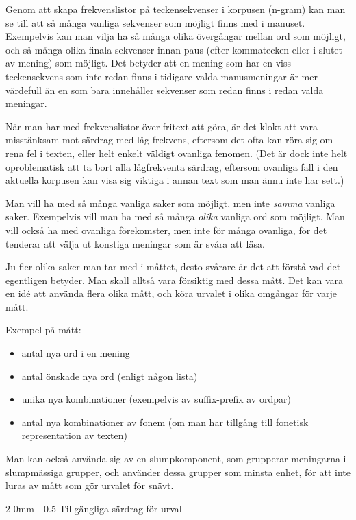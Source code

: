 \documentclass[11pt, a4paper, twoside]{article}
\makeatletter
\renewcommand{\subsection}{\@startsection
  {subsection}%
  {2}%
  {0mm}%
  {-\baselineskip}%
  {0.5\baselineskip}%
  {\bfseries\sffamily\large}}%
\makeatother
\begin{document}
Genom att skapa frekvenslistor på teckensekvenser i korpusen (n-gram) kan man se till att så många vanliga sekvenser som möjligt finns med i manuset. Exempelvis kan man vilja ha så många olika övergångar mellan ord som möjligt, och så många olika finala sekvenser innan paus (efter kommatecken eller i slutet av mening) som möjligt. Det betyder att en mening som har en viss teckensekvens som inte redan finns i tidigare valda manusmeningar är mer värdefull än en som bara innehåller sekvenser som redan finns i redan valda meningar. 

När man har med frekvenslistor över fritext att göra, är det klokt att vara misstänksam mot särdrag med låg frekvens, eftersom det ofta kan röra sig om rena fel i texten, eller helt enkelt väldigt ovanliga fenomen. (Det är dock inte helt oproblematisk att ta bort alla lågfrekventa särdrag, eftersom ovanliga fall i den aktuella korpusen kan visa sig viktiga i annan text som man ännu inte har sett.)

Man vill ha med så många vanliga saker som möjligt, men inte {\em samma} vanliga saker. Exempelvis vill man ha med så många {\em olika} vanliga ord som möjligt. Man vill också ha med ovanliga förekomster, men inte för många ovanliga, för det tenderar att välja ut konstiga meningar som är svåra att läsa.

Ju fler olika saker man tar med i måttet, desto svårare är det att förstå vad det egentligen betyder.
Man skall alltså vara försiktig med dessa mått. Det kan vara en idé att använda flera olika mått, och köra urvalet i olika omgångar för varje mått.

Exempel på mått:
\begin{itemize}
\item antal nya ord i en mening
\item antal önskade nya ord (enligt någon lista)
\item unika nya kombinationer (exempelvis av suffix-prefix av ordpar)
\item antal nya kombinationer av fonem (om man har tillgång till fonetisk representation av texten)
\end{itemize}

Man kan också använda sig av en slumpkomponent, som grupperar meningarna i slumpmässiga grupper, och använder dessa grupper som minsta enhet, för att inte luras av mått som gör urvalet för snävt.


\subsection{Tillgängliga särdrag för urval}
\end{document}
